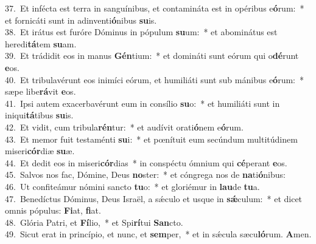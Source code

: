 {37.~}Et infécta est terra in sanguínibus, et contamináta est in opéribus e\textbf{ó}rum:~* et fornicáti sunt in adinventi\textbf{ó}nibus \textbf{su}is.\\
{38.~}Et irátus est furóre Dóminus in pópulum \textbf{su}um:~* et abominátus est heredi\textbf{tá}tem \textbf{su}am.\\
{39.~}Et trádidit eos in manus \textbf{Gén}tium:~* et domináti sunt eórum qui o\textbf{dé}runt \textbf{e}os.\\
{40.~}Et tribulavérunt eos inimíci eórum, et humiliáti sunt sub mánibus e\textbf{ó}rum:~* sæpe libe\textbf{rá}vit \textbf{e}os.\\
{41.~}Ipsi autem exacerbavérunt eum in consílio \textbf{su}o:~* et humiliáti sunt in iniqui\textbf{tá}tibus \textbf{su}is.\\
{42.~}Et vidit, cum tribula\textbf{rén}tur:~* et audívit orati\textbf{ó}nem e\textbf{ó}rum.\\
{43.~}Et memor fuit testaménti \textbf{su}i:~* et pœnítuit eum secúndum multitúdinem miseri\textbf{cór}diæ \textbf{su}æ.\\
{44.~}Et dedit eos in miseri\textbf{cór}dias~* in conspéctu ómnium qui \textbf{cé}perant \textbf{e}os.\\
{45.~}Salvos nos fac, Dómine, Deus \textbf{no}ster:~* et cóngrega nos de \textbf{na}ti\textbf{ó}nibus:\\
{46.~}Ut confiteámur nómini sancto \textbf{tu}o:~* et gloriémur in \textbf{lau}de \textbf{tu}a.\\
{47.~}Benedíctus Dóminus, Deus Israël, a sǽculo et usque in \textbf{sǽ}culum:~* et dicet omnis pópulus: \textbf{Fi}at, \textbf{fi}at.\\
{48.~}Glória Patri, et \textbf{Fí}lio,~* et Spi\textbf{rí}tui \textbf{San}cto.\\
{49.~}Sicut erat in princípio, et nunc, et \textbf{sem}per,~* et in sǽcula sæcu\textbf{ló}rum. \textbf{A}men.\\
